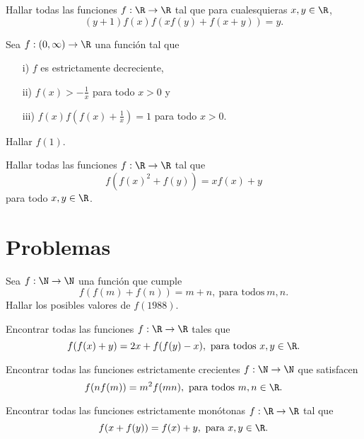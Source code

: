 \documentclass[12pt]{article}
\begin{document}
   \begin{exercise}
      Hallar todas las funciones $f : \R \to \R$ tal que para cualesquieras $x,y \in \R$,
      \[
         (y + 1)f(x)  f(x f(y) + f(x + y)) = y.
      \]
   \end{exercise}

   \begin{exercise}
      Sea $f: (0, \infty) \to \R$ una función tal que
      \begin{enumerate}
         \item[i)] $f$ es estrictamente decreciente,
         \item[ii)] $f(x) > - \frac{1}{x}$ para todo $x > 0$ y
         \item[iii)] $f(x)f\left(f(x) + \frac{1}{x}\right) = 1$ para todo $x > 0$.
      \end{enumerate}
      Hallar $f(1)$.
   \end{exercise}

   \begin{exercise}
      Hallar todas las funciones $f : \R \to \R$ tal que
      \[
         f\left(f(x)^2 + f(y)\right) = xf(x) + y
      \]
      para todo $x,y \in \R$.
   \end{exercise}


   \section{Problemas}

   \begin{prob-without-section}
      Sea $f: \N \to \N$ una función que cumple
      \[
         f(f(m) + f(n)) = m + n,\ \text{para todos}\ m,n.
      \]
      Hallar los posibles valores de $f(1988)$.
   \end{prob-without-section}

   \begin{prob-without-section}
      Encontrar todas las funciones $f : \R \to \R$ tales que
      \[
         f(f(x) + y) = 2x + f(f(y) - x),\ \text{para todos}\ x,y \in \R.
      \]
   \end{prob-without-section}

   \begin{prob-without-section}[Ibero, 1993]
      Encontrar todas las funciones estrictamente crecientes $f : \N \to \N$ que satisfacen
      \[
         f(n f(m)) = m^2 f(mn),\ \text{para todos}\ m,n \in \R.
      \]
   \end{prob-without-section}

   \begin{prob-without-section}[Italia, 1999]
      Encontrar todas las funciones estrictamente monótonas $f : \R \to \R$ tal que
      \[
         f(x + f(y)) = f(x) + y,\ \text{para}\ x,y \in \R.
      \]
   \end{prob-without-section}
\end{document}
